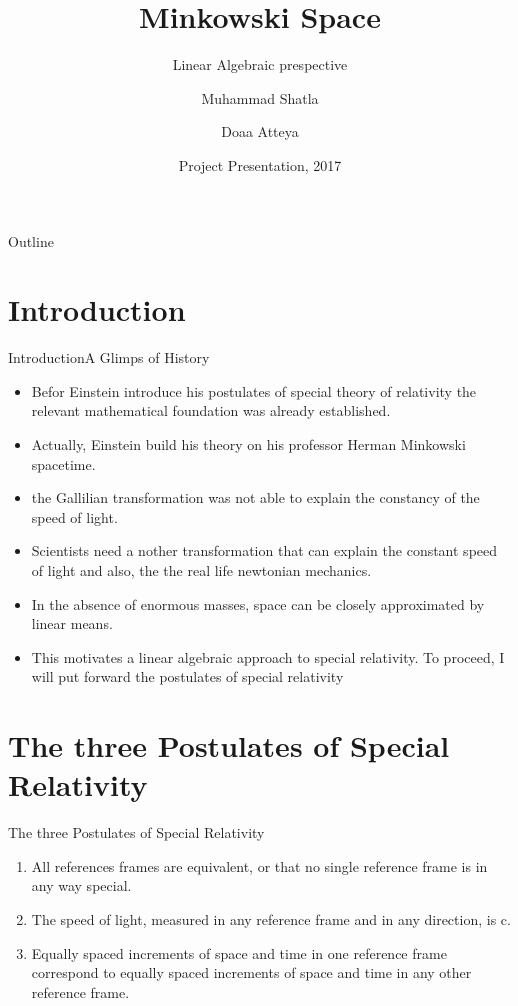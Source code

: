 \documentclass{beamer}
\title{Minkowski Space}
\subtitle{Linear Algebraic prespective}
\author{Muhammad Shatla\inst{1} \and Doaa Atteya\inst{2}}
\institute[University of Science And Technology at Zewailcity] %
{
  \inst{1}%
  Department of Mathematics\\
  University of University of Science And Technology at Zewailcity
}
\date{Project Presentation, 2017}
\begin{document}
\begin{frame}
  \titlepage
\end{frame}

\begin{frame}{Outline}
  \tableofcontents
\end{frame}

\section{Introduction}
\begin{frame}{Introduction}{A Glimps of History}
  \begin{itemize}
  \item {
   Befor Einstein introduce his postulates of special theory of relativity the relevant mathematical foundation
was already established.
  }
  \item {
    Actually, Einstein build his theory on his professor Herman Minkowski spacetime.
  }
  \item {the Gallilian
transformation was not able to explain the constancy of the speed of light.}
\item{Scientists need a nother transformation
that can explain the constant speed of light and also, the the real life newtonian mechanics.}
\item{In the absence of enormous masses, space can be closely approximated by
linear means.}
\item{This motivates a linear algebraic approach to special relativity. To proceed, I will put forward
the postulates of special relativity}
  \end{itemize}
\end{frame}



\section{The three Postulates of Special Relativity}
\begin{frame}{The three Postulates of Special Relativity}
\begin{enumerate}
\item All references frames are equivalent, or that no single reference frame is in any way special.

\item The speed of light, measured in any reference frame and in any direction, is c.
\item Equally spaced increments of space and time in one reference frame correspond to equally spaced increments of space and time in any other reference frame.
\end{enumerate}
\end{frame}
\end{document}
